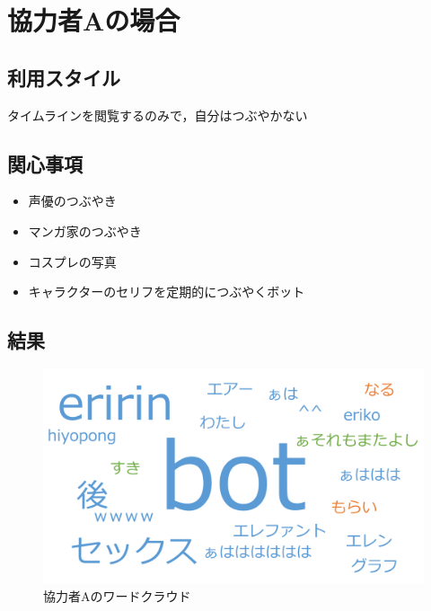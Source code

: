\section{協力者Aの場合}

\subsection{利用スタイル}
タイムラインを閲覧するのみで，自分はつぶやかない

\subsection{関心事項}
\begin{itemize}
	\item 声優のつぶやき
	\item マンガ家のつぶやき
	\item コスプレの写真
	\item キャラクターのセリフを定期的につぶやくボット
\end{itemize}

\subsection{結果}

\begin{figure}[H]
\centering
\includegraphics[width=13cm]{izumi_cloud.png}
\caption{協力者Aのワードクラウド}\label{izumicloud}
\end{figure}

